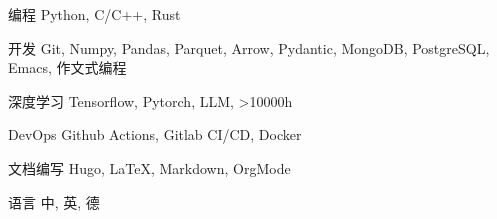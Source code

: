 \documentclass[../cv.tex]{subfiles}
\begin{document}


\begin{cvskills}

  \cvskill
    {编程} %
    {Python, C/C++, Rust} %

  \cvskill
    {开发} %
    {Git, Numpy, Pandas, Parquet, Arrow, Pydantic, MongoDB, PostgreSQL, Emacs, 作文式编程} %

  \cvskill
    {深度学习} %
    {Tensorflow, Pytorch, LLM, >10000h} %

  \cvskill
    {DevOps} %
    {Github Actions, Gitlab CI/CD, Docker} %

  \cvskill
    {文档编写} %
    {Hugo, LaTeX, Markdown, OrgMode} %

  \cvskill
    {语言} %
    {中, 英, 德} %

\end{cvskills}
\end{document}
